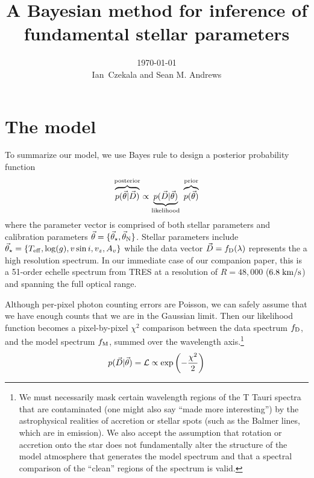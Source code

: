 \documentclass[preprint]{aastex} %
\newcommand{\vt}{\vec{\theta}}
\newcommand{\vstar}{\vt_{\star}}
\newcommand{\vN}{\vt_{\rm N}}
\newcommand{\fM}{f_{\rm M}}
\newcommand{\fD}{f_{\rm D}}
\newcommand{\vD}{\vec{D}}
\begin{document}
\title{A Bayesian method for inference of fundamental stellar parameters}
\author{\today{}\\
\medskip
Ian~Czekala and Sean M. Andrews
}




\section{The model}

To summarize our model, we use Bayes rule to design a posterior probability function
\begin{equation}
  \overbrace{p(\vt | \vD)}^{\rm posterior} \propto \underbrace{p(\vD | \vt)}_{\rm likelihood} \; \overbrace{p(\vt)}^{\rm prior}
  \label{eqn:posterior}
\end{equation}
where the parameter vector is comprised of both stellar parameters and calibration parameters $\vt = \{\vstar, \vN \}$. Stellar parameters include $\vstar = \{T_{\rm eff}, \log(g), v \sin i, v_z, A_v \}$ while the data vector $\vD = \fD(\lambda)$ represents the a high resolution spectrum. In our immediate case of our companion paper, this is a 51-order echelle spectrum from TRES at a resolution of $R=48,000$ ($6.8\;{\rm km/s}$) and spanning the full optical range.

Although per-pixel photon counting errors are Poisson, we can safely assume that we have enough counts that we are in the Gaussian limit. Then our likelihood function becomes a pixel-by-pixel $\chi^2$ comparison between the data spectrum $\fD$, and the model spectrum $\fM$, summed over the wavelength axis.\footnote{We must necessarily mask certain wavelength regions of the T Tauri spectra that are contaminated (one might also say ``made more interesting'') by the astrophysical realities of accretion or stellar spots (such as the Balmer lines, which are in emission).  We also accept the assumption that rotation or accretion onto the star does not fundamentally alter the structure of the model atmosphere that generates the model spectrum and that a spectral comparison of the ``clean'' regions of the spectrum is valid.} 
\begin{equation}
 p(\vD | \vt) = {\cal L} \propto \exp \left(-\frac{\chi^2}{2} \right)
\end{equation}
\end{document}
